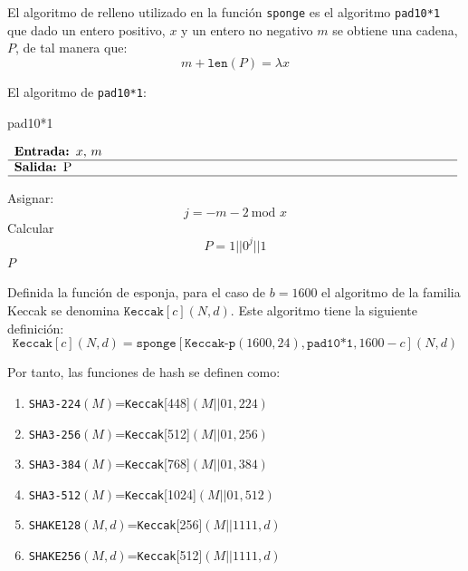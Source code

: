 El algoritmo de relleno utilizado en la función \texttt{sponge} es el algoritmo \texttt{pad10*1} que dado un entero positivo, \(x\) y un entero no negativo \(m\) se obtiene una cadena, \(P\), de tal manera que:
 \begin{equation}
 	m+\texttt{len}(P)=\lambda x
 \end{equation}
 
El algoritmo de \texttt{pad10*1}: 
\begin{algorithm}[H]
	\caption{pad10*1}
	$\begin{array}{p{\textwidth}}
		\textbf{Entrada: }\(x\), \(m\) \\ 
		\hline
		\textbf{Salida: }P\\ 
		\hline
	\end{array}$
	\begin{algorithmic}[1]
		\State Asignar:
		\begin{equation}
			j=-m-2 \ \text{mod } x
		\end{equation}
		\State Calcular
		\begin{equation}
			P=1|| 0^j||1
		\end{equation}
		\State \Return $P$
	\end{algorithmic}
\end{algorithm}

Definida la función de esponja, para el caso de \(b=1600\) el algoritmo de la familia Keccak se denomina $\texttt{Keccak}[c](N,d)$. Este algoritmo tiene la siguiente definición:
\begin{equation}
	\texttt{Keccak}[c](N,d)=\texttt{sponge}[\texttt{Keccak-p}(1600,24),\texttt{pad10*1},1600-c](N,d)
\end{equation}


Por tanto, las funciones de hash se definen como:
\begin{enumerate}
	\item \texttt{SHA3-224}$(M)$=\texttt{Keccak}[448]$(M||01,224)$
	\item \texttt{SHA3-256}$(M)$=\texttt{Keccak}[512]$(M||01,256)$
	\item \texttt{SHA3-384}$(M)$=\texttt{Keccak}[768]$(M||01,384)$
	\item \texttt{SHA3-512}$(M)$=\texttt{Keccak}[1024]$(M||01,512)$
	\item \texttt{SHAKE128}$(M,d)$=\texttt{Keccak}[256]$(M||1111,d)$
	\item \texttt{SHAKE256}$(M,d)$=\texttt{Keccak}[512]$(M||1111,d)$
\end{enumerate}
